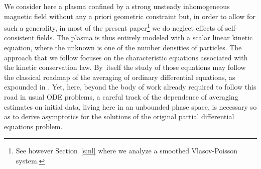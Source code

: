\documentclass[JEP,XML,SOM,Unicode]{cedram}
\theoremstyle{plain}
\theoremstyle{definition}
\begin{document}
We consider here a plasma confined by a strong unsteady inhomogeneous magnetic field without any a priori geometric constraint but, in order to allow for such a generality, in most of the present paper\footnote{See however Section~\ref{s:nl} where we analyze a smoothed Vlasov-Poisson system.} we do neglect effects of self-consistent fields. The plasma is thus entirely modeled with a scalar linear kinetic equation, where the unknown is one of the number densities of particles. The approach that we follow focuses on the characteristic equations associated with the kinetic conservation law. By~itself the study of those equations may follow the classical roadmap of the averaging of ordinary differential equations, as expounded in \cite{Bogoliubov-Mitropolsky_oscillations,Sanders-Verhulst-Murdock_averaging}. Yet, here, beyond the body of work already required to follow this road in usual ODE problems, a careful track of the dependence of averaging estimates on initial data, living here in an unbounded phase space, is necessary so as to derive asymptotics for the solutions of the original partial differential equations problem.
\end{document}

